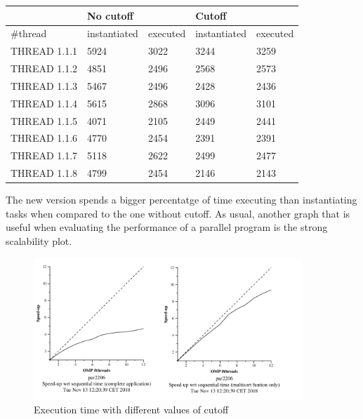 \documentclass{article}
\begin{document}
\begin{table}[!h]
\begin{tabular}{l|ll|ll|}
\cline{2-5}
                                   & No cutoff                         &          & Cutoff                            &          \\ \hline
\multicolumn{1}{|l|}{\#thread}     & \multicolumn{1}{l|}{instantiated} & executed & \multicolumn{1}{l|}{instantiated} & executed \\ \hline
\multicolumn{1}{|l|}{THREAD 1.1.1} & \multicolumn{1}{l|}{5924}         & 3022     & \multicolumn{1}{l|}{3244}         & 3259     \\ \hline
\multicolumn{1}{|l|}{THREAD 1.1.2} & \multicolumn{1}{l|}{4851}         & 2496     & \multicolumn{1}{l|}{2568}         & 2573     \\ \hline
\multicolumn{1}{|l|}{THREAD 1.1.3} & \multicolumn{1}{l|}{5467}         & 2496     & \multicolumn{1}{l|}{2428}         & 2436     \\ \hline
\multicolumn{1}{|l|}{THREAD 1.1.4} & \multicolumn{1}{l|}{5615}         & 2868     & \multicolumn{1}{l|}{3096}         & 3101     \\ \hline
\multicolumn{1}{|l|}{THREAD 1.1.5} & \multicolumn{1}{l|}{4071}         & 2105     & \multicolumn{1}{l|}{2449}         & 2441     \\ \hline
\multicolumn{1}{|l|}{THREAD 1.1.6} & \multicolumn{1}{l|}{4770}         & 2454     & \multicolumn{1}{l|}{2391}         & 2391     \\ \hline
\multicolumn{1}{|l|}{THREAD 1.1.7} & \multicolumn{1}{l|}{5118}         & 2622     & \multicolumn{1}{l|}{2499}         & 2477     \\ \hline
\multicolumn{1}{|l|}{THREAD 1.1.8} & \multicolumn{1}{l|}{4799}         & 2454     & \multicolumn{1}{l|}{2146}         & 2143     \\ \hline
\end{tabular}
\end{table}

\justify
The new version spends a bigger percentatge of time executing than instantiating tasks when compared to the one without cutoff.
\justify
As usual, another graph that is useful when evaluating the performance of a parallel program is the strong scalability plot.

\begin{figure}[!h]
    \centering
    \includegraphics[width=0.9\textwidth]{treeStrongC.png}
    \caption{Execution time with different values of cutoff }
    \label{fig:tareador}
\end{figure}
\justify
\end{document}
